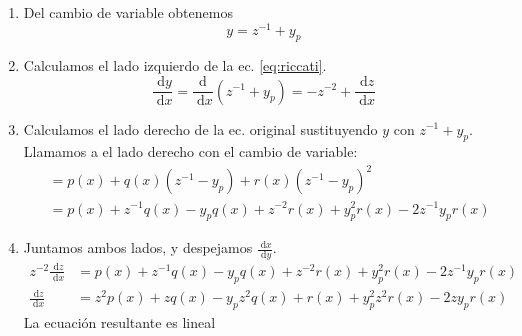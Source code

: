 \documentclass[a4paper]{article}
\newcommand{\dif}[1]{\;\mathrm{d}#1}
\begin{document}
\begin{enumerate}
    \item Del cambio de variable obtenemos
    \begin{equation*}
        y = z^{-1} + y_{p}
    \end{equation*}

    \item Calculamos el lado izquierdo de la ec. \eqref{eq:riccati}.
    \begin{equation*}
        \frac{\dif{y}}{\dif{x}} = \frac{\mathrm{d}}{\dif{x}} \left( z^{-1} + y_p \right) = -z^{-2} + \frac{\dif{z}}{\dif{x}}
    \end{equation*}

    \item Calculamos el lado derecho de la ec. original sustituyendo $y$ con $z^{-1} + y_p$.
    Llamamos a el lado derecho con el cambio de variable:
    \begin{align*}
       &= p(x) + q(x) (z^{-1} - y_p) + r(x) (z^{-1} - y_p)^{2} \\
       &= p(x) + z^{-1} q(x) - y_p q(x) + z^{-2} r(x) + y^{2}_{p} r(x) - 2 z^{-1} y_p r(x)
    \end{align*}

    \item Juntamos ambos lados, y despejamos $\frac{\dif{x}}{\dif{y}}$.
    \begin{align*}
        z^{-2}  \frac{\dif{z}}{\dif{x}} &= p(x) + z^{-1} q(x) - y_p q(x) + z^{-2} r(x) + y^{2}_{p} r(x) - 2 z^{-1} y_p r(x) \\
        \frac{\dif{z}}{\dif{x}} &= z^{2} p(x) + z q(x) - y_p z^{2} q(x) + r(x) + y^{2}_{p} z^{2} r(x) - 2 z y_p r(x)
    \end{align*}
    La ecuación resultante es lineal
\end{enumerate}
\end{document}
